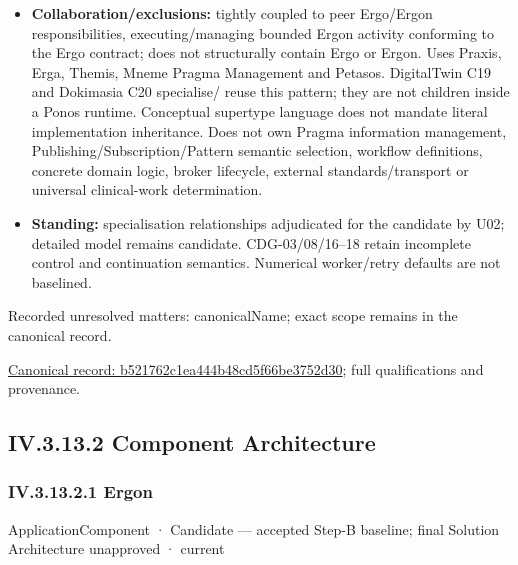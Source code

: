 \begin{itemize}
\item \textbf{Collaboration/exclusions:} tightly coupled to peer Ergo/Ergon responsibilities,
  executing/managing bounded Ergon activity conforming to the Ergo contract;
  does not structurally contain Ergo or Ergon. Uses Praxis, Erga, Themis, Mneme
  Pragma Management and Petasos. DigitalTwin C19 and Dokimasia C20 specialise/
  reuse this pattern; they are not children inside a Ponos runtime. Conceptual
  supertype language does not mandate literal implementation inheritance.
  Does not own Pragma information management, Publishing/Subscription/Pattern
  semantic selection, workflow definitions, concrete domain logic, broker lifecycle,
  external standards/transport or universal clinical-work determination.

\item \textbf{Standing:} specialisation relationships adjudicated for the candidate by U02;
  detailed model remains candidate. CDG-03/08/16–18 retain incomplete control
  and continuation semantics. Numerical worker/retry defaults are not baselined.

\end{itemize}

{\small Recorded unresolved matters: canonicalName; exact scope remains in the canonical record.}\par
{\footnotesize \href{../../../../../../../continuum/application/application-component/b521762c1ea444b48cd5f66be3752d30.md}{Canonical record: b521762c1ea444b48cd5f66be3752d30}; full qualifications and provenance.}\par
\subsection*{IV.3.13.2 Component Architecture}
\label{navigation:IV.3.13.2}

\subsubsection*{IV.3.13.2.1 Ergon}
\label{navigation:IV.3.13.2.1}

\label{element:49c9eb2bef0c47b8b5328621d5fc5479}
{\small ApplicationComponent · Candidate — accepted Step-B baseline; final Solution Architecture unapproved · current}\par

